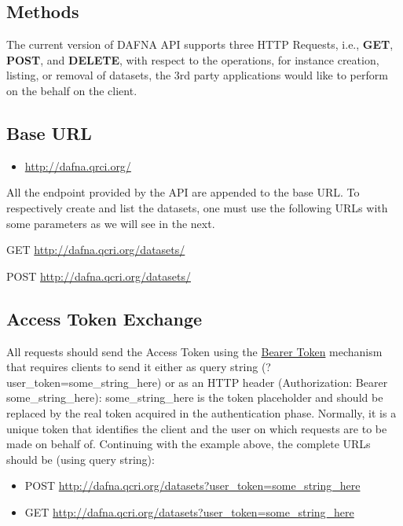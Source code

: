 \documentclass[a4paper,10pt]{scrartcl}
\begin{document}
\subsection{Methods}
The current version of DAFNA API supports three HTTP Requests, i.e., \textbf{GET}, \textbf{POST}, and \textbf{DELETE}, 
with respect to the operations, for instance creation, listing, or removal of datasets, the 3rd party applications would
like to perform on the behalf on the client.
\subsection{Base URL}
\begin{itemize}
 \item \href{http://dafna.qrci.org/}{http://dafna.qrci.org/}
\end{itemize}
All the endpoint provided by the API are appended to the base URL.
To respectively create and list the datasets, one must use the following URLs with some parameters
as we will see in the next. 
\begin{description}
\item GET \href{http://dafna.qcri.org/datasets/}{http://dafna.qcri.org/datasets/} \\
 \item POST \href{http://dafna.qcri.org/datasets/}{http://dafna.qcri.org/datasets/}
\end{description}

\subsection{Access Token Exchange}
All requests should send the Access Token using the \href{http://oauth2.thephpleague.com/token-types/}{Bearer Token}
mechanism that requires clients to send it either as query string (?user\_token=some\_string\_here)
or as an HTTP header (Authorization: Bearer some\_string\_here): some\_string\_here is the
token placeholder and should be replaced by the real token acquired in the authentication phase.
Normally, it is a unique token that identifies the client and the user on which
requests are to be made on behalf of. Continuing with the example above, the complete
URLs should be (using query string): 
\begin{itemize}
 \item POST \href{http://dafna.qcri.org/datasets?user\_token=some\_string\_here}{http://dafna.qcri.org/datasets?user\_token=some\_string\_here} \\
  \item GET \href{http://dafna.qcri.org/datasets?user\_token=some\_string\_here}{http://dafna.qcri.org/datasets?user\_token=some\_string\_here} 
\end{itemize}
\end{document}
